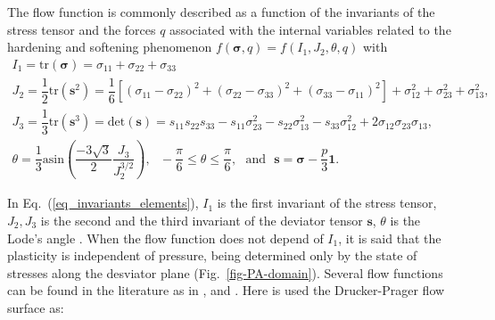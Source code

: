 \documentclass[Journal,letterpaper]{ascelike-new}
\newcommand{\sll}{\boldsymbol{s}}
\newcommand{\onell}{\boldsymbol{1}}
\newcommand{\stress}{\boldsymbol{\sigma}}
\begin{document}

The flow function is commonly described as a function of the invariants of the stress tensor and the forces $q$ associated with the internal variables related to the hardening and softening phenomenon $f(\stress,q) = f(I_1,J_2,\theta,q)$ with
\begin{equation} \label{eq_invariants_elements}
	\begin{array}{lcl}
		I_1 = \text{tr}(\stress) = \sigma_{11}+\sigma_{22}+\sigma_{33}\\
		J_2 = \dfrac{1}{2}\text{tr}(\sll^2) = \dfrac{1}{6}\left[ (\sigma_{11}-\sigma_{22})^2 + (\sigma_{22}-\sigma_{33})^2 + (\sigma_{33}-\sigma_{11})^2 \right] + \sigma_{12}^2+ \sigma_{23}^2+ \sigma_{13}^2, \\
		J_3 = \dfrac{1}{3}\text{tr}(\sll^3) = \text{det}(\sll) = s_{11}s_{22}s_{33}-s_{11}\sigma_{23}^2-s_{22}\sigma_{13}^2-s_{33}\sigma_{12}^2+2\sigma_{12}\sigma_{23}\sigma_{13}, \\ 
		\theta = \dfrac{1}{3}\text{asin}\left( \dfrac{-3\sqrt{3}}{2} \dfrac{J_3}{J_2^{3/2}} \right),~~~
		-\dfrac{\pi}{6} \le \theta \le \dfrac{\pi}{6},~~~\text{and}~~~\sll = \stress - \dfrac{p}{3}\onell.
	\end{array}\;
\end{equation}

In Eq.~(\ref{eq_invariants_elements}), $I_1$ is the first invariant of the stress tensor, $J_2,J_3$ is the second and the third invariant of the deviator tensor $\sll$, $\theta$ is the Lode's angle \cite{chen1988}. When the flow function does not depend of $I_1$, it is said that the plasticity is independent of pressure, being determined only by the state of stresses along the desviator plane (Fig.~\ref{fig-PA-domain}). Several flow functions can be found in the literature as in ,  and . Here is used the Drucker-Prager flow surface as:
\end{document}

